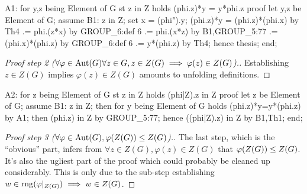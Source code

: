 \nwenddocs{}\endmoddef\nwstartdeflinemarkup{}\nwenddeflinemarkup
A1: for y,z being Element of G st z in Z
holds (phi.z)*y = y*phi.z
proof
  let y,z be Element of G;
  assume B1: z in Z;
  set x = (phi").y;
  (phi.z)*y = (phi.z)*(phi.x) by Th4
           .= phi.(z*x) by GROUP_6:def 6
           .= phi.(x*z) by B1,GROUP_5:77
           .= (phi.x)*(phi.z) by GROUP_6:def 6
           .= y*(phi.z) by Th4;
  hence thesis;
end;
\nwendcode{}\nwdocspar

\begin{proof}[Proof step 2 ($\forall\varphi\in\operatorname{Aut}(G)\forall z\in G, z\in Z(G)\implies \varphi(z)\in Z(G)$).]
Establishing $z\in Z(G)$ implies $\varphi(z)\in Z(G)$ amounts to
unfolding definitions.
\end{proof}

\nwenddocs{}\endmoddef\nwstartdeflinemarkup{}\nwenddeflinemarkup
A2: for z being Element of G st z in Z
holds (phi|Z).z in Z
proof
  let z be Element of G;
  assume B1: z in Z;
  then for y being Element of G holds (phi.z)*y=y*(phi.z) by A1;
  then (phi.z) in Z by GROUP_5:77;
  hence ((phi|Z).z) in Z by B1,Th1;
end;
\nwendcode{}\nwdocspar

\begin{proof}[Proof step 3 ($\forall\varphi\in\operatorname{Aut}(G),\varphi(Z(G))\leq Z(G)$).]
The last step, which is the ``obvious'' part, infers from
$\forall z\in Z(G),\varphi(z)\in Z(G)$ that $\varphi(Z(G))\leq Z(G)$.
It's also the ugliest part of the proof which could probably be cleaned
up considerably. This is only due to the sub-step establishing
$w\in\operatorname{rng}(\varphi|_{Z(G)})\implies w\in Z(G)$.
\end{proof}

